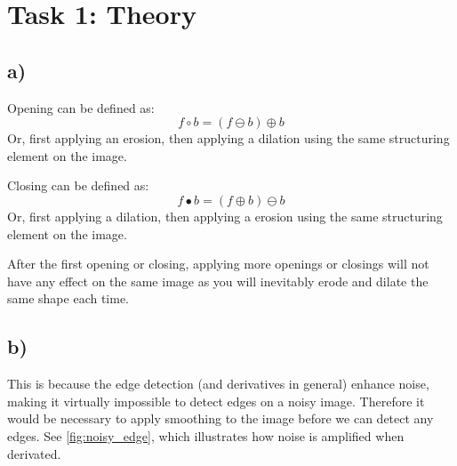 \section{Task 1: Theory}
\subsection*{a)}
Opening can be defined as: 
\begin{equation}
    f \circ b = (f \ominus b) \oplus b
\end{equation}
Or, first applying an erosion, then applying a dilation using the same structuring element on the image. 

Closing can be defined as: 
\begin{equation}
    f \bullet b = (f \oplus b) \ominus b
\end{equation}
Or, first applying a dilation, then applying a erosion using the same structuring element on the image. 

After the first opening or closing, applying more openings or closings will not have any effect on the same image as you will inevitably erode and dilate the same shape each time. 

\subsection*{b)}
This is because the edge detection (and derivatives in general) enhance noise, making it virtually impossible to detect edges on a noisy image. Therefore it would be necessary to apply smoothing to the image before we can detect any edges. See \cref{fig:noisy_edge}, which illustrates how noise is amplified when derivated. 

